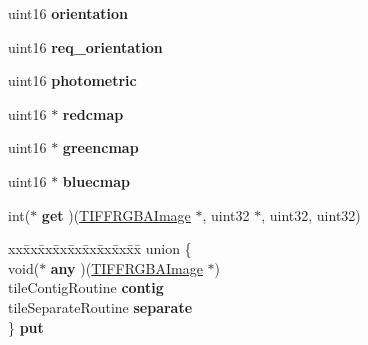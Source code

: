 \begin{DoxyCompactItemize}
\item 
\hypertarget{struct___t_i_f_f_r_g_b_a_image_a41020831630c1ea4d2cc5dbd5cbb212b}{}uint16 {\bfseries orientation}\label{struct___t_i_f_f_r_g_b_a_image_a41020831630c1ea4d2cc5dbd5cbb212b}

\item 
\hypertarget{struct___t_i_f_f_r_g_b_a_image_a3b5d6337f92cb04e2d6971f462fe8498}{}uint16 {\bfseries req\+\_\+orientation}\label{struct___t_i_f_f_r_g_b_a_image_a3b5d6337f92cb04e2d6971f462fe8498}

\item 
\hypertarget{struct___t_i_f_f_r_g_b_a_image_a89b5e7f936c883d0eb787d23d984d6d5}{}uint16 {\bfseries photometric}\label{struct___t_i_f_f_r_g_b_a_image_a89b5e7f936c883d0eb787d23d984d6d5}

\item 
\hypertarget{struct___t_i_f_f_r_g_b_a_image_a80400e79f09d735f2867c9d5606178f0}{}uint16 $\ast$ {\bfseries redcmap}\label{struct___t_i_f_f_r_g_b_a_image_a80400e79f09d735f2867c9d5606178f0}

\item 
\hypertarget{struct___t_i_f_f_r_g_b_a_image_a62ee06a0cbdc549437779f7de7c30011}{}uint16 $\ast$ {\bfseries greencmap}\label{struct___t_i_f_f_r_g_b_a_image_a62ee06a0cbdc549437779f7de7c30011}

\item 
\hypertarget{struct___t_i_f_f_r_g_b_a_image_ada1cf74b8154681b986ce43e89e9814e}{}uint16 $\ast$ {\bfseries bluecmap}\label{struct___t_i_f_f_r_g_b_a_image_ada1cf74b8154681b986ce43e89e9814e}

\item 
\hypertarget{struct___t_i_f_f_r_g_b_a_image_a6c287af4953a5ed61387f123f8fdf4e5}{}int($\ast$ {\bfseries get} )(\hyperlink{struct___t_i_f_f_r_g_b_a_image}{T\+I\+F\+F\+R\+G\+B\+A\+Image} $\ast$, uint32 $\ast$, uint32, uint32)\label{struct___t_i_f_f_r_g_b_a_image_a6c287af4953a5ed61387f123f8fdf4e5}

\item 
\hypertarget{struct___t_i_f_f_r_g_b_a_image_a2912615006ee8356f5ae148e95e992b5}{}\begin{tabbing}
xx\=xx\=xx\=xx\=xx\=xx\=xx\=xx\=xx\=\kill
union \{\\
\>void($\ast$ {\bfseries any} )(\hyperlink{struct___t_i_f_f_r_g_b_a_image}{TIFFRGBAImage} $\ast$)\\
\>tileContigRoutine {\bfseries contig}\\
\>tileSeparateRoutine {\bfseries separate}\\
\} {\bfseries put}\label{struct___t_i_f_f_r_g_b_a_image_a2912615006ee8356f5ae148e95e992b5}
\\


\end{tabbing}
\end{DoxyCompactItemize}
